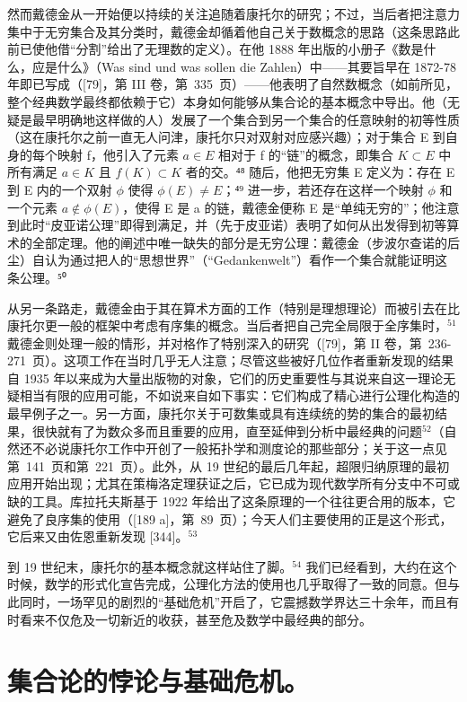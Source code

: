 然而戴德金从一开始便以持续的关注追随着康托尔的研究；不过，当后者把注意力集中于无穷集合及其分类时，戴德金却循着他自己关于数概念的思路（这条思路此前已使他借“分割”给出了无理数的定义）。在他 1888 年出版的小册子《数是什么，应是什么》（Was sind und was sollen die Zahlen）中——其要旨早在 1872-78 年即已写成（{[}79{]}，第 III 卷，第~335~页）——他表明了自然数概念（如前所见，整个经典数学最终都依赖于它）本身如何能够从集合论的基本概念中导出。他（无疑是最早明确地这样做的人）发展了一个集合到另一个集合的任意映射的初等性质（这在康托尔之前一直无人问津，康托尔只对双射对应感兴趣）；对于集合 E 到自身的每个映射 f，他引入了元素 \(a \in E\) 相对于 f 的“链”的概念，即集合 \(K \subset E\) 中所有满足 \(a \in K\) 且 \(f(K) \subset K\) 者的交。⁴⁸ 随后，他把无穷集 E 定义为：存在 E 到 E 内的一个双射 \(\phi\) 使得 \(\phi(E) \neq E\)；⁴⁹ 进一步，若还存在这样一个映射 \(\phi\) 和一个元素 \(a \notin \phi(E)\)，使得 E 是 a 的链，戴德金便称 E 是“单纯无穷的”；他注意到此时“皮亚诺公理”即得到满足，并（先于皮亚诺）表明了如何从出发得到初等算术的全部定理。他的阐述中唯一缺失的部分是无穷公理：戴德金（步波尔查诺的后尘）自认为通过把人的“思想世界”（“Gedankenwelt”）看作一个集合就能证明这条公理。⁵⁰

从另一条路走，戴德金由于其在算术方面的工作（特别是理想理论）而被引去在比康托尔更一般的框架中考虑有序集的概念。当后者把自己完全局限于全序集时，\(^{51}\) 戴德金则处理一般的情形，并对格作了特别深入的研究（{[}79{]}，第 II 卷，第~236-271~页）。这项工作在当时几乎无人注意；尽管这些被好几位作者重新发现的结果自 1935 年以来成为大量出版物的对象，它们的历史重要性与其说来自这一理论无疑相当有限的应用可能，不如说来自如下事实：它们构成了精心进行公理化构造的最早例子之一。另一方面，康托尔关于可数集或具有连续统的势的集合的最初结果，很快就有了为数众多而且重要的应用，直至延伸到分析中最经典的问题\(^{52}\)（自然还不必说康托尔工作中开创了一般拓扑学和测度论的那些部分；关于这一点见第~141~页和第~221~页）。此外，从 19 世纪的最后几年起，超限归纳原理的最初应用开始出现；尤其在策梅洛定理获证之后，它已成为现代数学所有分支中不可或缺的工具。库拉托夫斯基于 1922 年给出了这条原理的一个往往更合用的版本，它避免了良序集的使用（{[}189 a{]}，第~89~页）；今天人们主要使用的正是这个形式，它后来又由佐恩重新发现 {[}344{]}。\(^{53}\)

到 19 世纪末，康托尔的基本概念就这样站住了脚。\(^{54}\) 我们已经看到，大约在这个时候，数学的形式化宣告完成，公理化方法的使用也几乎取得了一致的同意。但与此同时，一场罕见的剧烈的“基础危机”开启了，它震撼数学界达三十余年，而且有时看来不仅危及一切新近的收获，甚至危及数学中最经典的部分。

\section*{集合论的悖论与基础危机。}
{}

